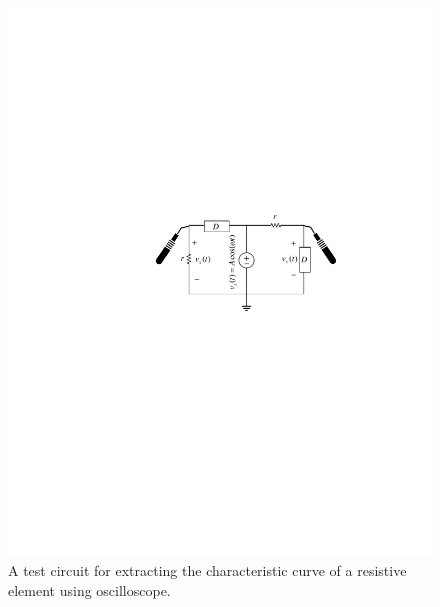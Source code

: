 \documentclass[11pt]{article}
\begin{document}
\begin{question}


    \begin{figure}[H]
        \centering
        \includegraphics[scale=1.2,angle=0]{Fig/cir3.pdf}
        \caption{A test circuit for extracting the characteristic curve of a resistive element using oscilloscope.} \label{fig:cir3}
    \end{figure}


\end{question}
\end{document}
